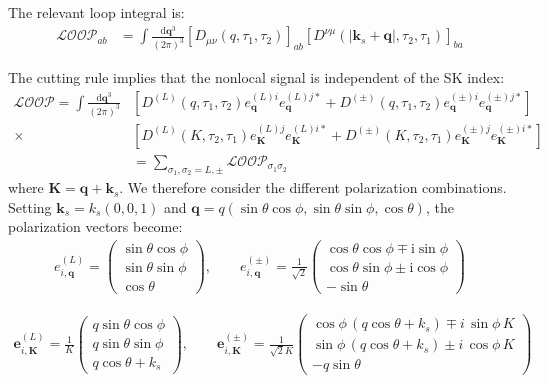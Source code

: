 \documentclass[a4paper,12pt]{article}
\def\di{{\mathrm{d}}}
\def\mb{\mathbf}
\begin{document}
The relevant loop integral is:
\begin{align}
    \mathcal{LOOP}_{ab} &= \int \frac{\di \mb{q}^3}{(2\pi)^3} \left[ D_{\mu\nu}(q,\tau_1,\tau_2) \right]_{ab} \left[ D^{\nu\mu}(|\mb{k}_s + \mb{q}|,\tau_2,\tau_1) \right]_{ba}
\end{align}

The cutting rule implies that the nonlocal signal is independent of the SK index:
\begin{align}
    \mathcal{LOOP} = \int \frac{\di \mb{q}^3}{(2\pi)^3} &\left[ D^{(L)}(q,\tau_1,\tau_2) e^{(L)i}_{\mb q} e^{(L)j*}_{\mb q} + D^{(\pm)}(q,\tau_1,\tau_2) e^{(\pm)i}_{\mb q} e^{(\pm)j*}_{\mb q} \right] \nonumber \\
    \times &\left[ D^{(L)}(K,\tau_2,\tau_1) e^{(L)j}_{\mb K} e^{(L)i*}_{\mb K} + D^{(\pm)}(K,\tau_2,\tau_1) e^{(\pm)j}_{\mb K} e^{(\pm)i*}_{\mb K} \right] \\
    &= \sum_{\sigma_1,\sigma_2=L,\pm} \mathcal{{LOOP}}_{\sigma_1\sigma_2}
\end{align}
where $\mb K=\mb q+\mb k_s$. We therefore consider the different polarization combinations. Setting $\mb k_s=k_s(0,0,1)$ and $\mb q=q(\sin\theta\cos\phi,\sin\theta\sin\phi,\cos\theta)$, the polarization vectors become:
\begin{align}
    e_{i,\mathbf{q}}^{(L)} = \begin{pmatrix} \sin\theta\cos\phi \\ \sin\theta\sin\phi \\ \cos\theta \end{pmatrix},\qquad
    e_{i,\mathbf{q}}^{(\pm)} = \frac{1}{\sqrt{2}} \begin{pmatrix} \cos\theta\cos\phi \mp \mathrm{i}\sin\phi \\ \cos\theta\sin\phi \pm \mathrm{i}\cos\phi \\ -\sin\theta \end{pmatrix}
\end{align}

\begin{align}
    \mathbf{e}_{i,\mathbf{K}}^{(L)} = 
    \frac{1}{K}
    \begin{pmatrix}
    q\sin\theta\cos\phi \\
    q\sin\theta\sin\phi \\
    q\cos\theta + k_s
    \end{pmatrix},\qquad
    \mathbf{e}_{i,\mathbf{K}}^{(\pm)} = 
    \frac{1}{\sqrt{2} K}
    \begin{pmatrix}
    \cos\phi\,(q\cos\theta + k_s) \mp i\,\sin\phi\,K \\
    \sin\phi\,(q\cos\theta + k_s) \pm i\,\cos\phi\,K\\
    -q\sin\theta
    \end{pmatrix}
\end{align}
\end{document}
